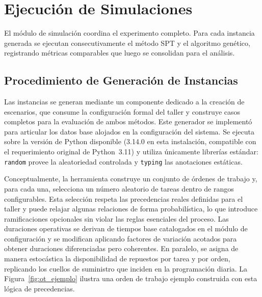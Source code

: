 \section{Ejecución de Simulaciones}

El módulo de simulación coordina el experimento completo. Para cada instancia generada se ejecutan consecutivamente el método SPT y el algoritmo genético, registrando métricas comparables que luego se consolidan para el análisis.

\subsection{Procedimiento de Generación de Instancias}
\label{subsec:procedimiento-instancias}

Las instancias se generan mediante un componente dedicado a la creación de escenarios, que consume la configuración formal del taller y construye casos completos para la evaluación de ambos métodos. Este generador se implementó para articular los datos base alojados en la configuración del sistema. Se ejecuta sobre la versión de Python disponible (3.14.0 en esta instalación, compatible con el requerimiento original de Python~3.11) y utiliza únicamente librerías estándar: \texttt{random} provee la aleatoriedad controlada y \texttt{typing} las anotaciones estáticas.

Conceptualmente, la herramienta construye un conjunto de órdenes de trabajo y, para cada una, selecciona un número aleatorio de tareas dentro de rangos configurables. Esta selección respeta las precedencias reales definidas para el taller y puede relajar algunas relaciones de forma probabilística, lo que introduce ramificaciones opcionales sin violar las reglas esenciales del proceso. Las duraciones operativas se derivan de tiempos base catalogados en el módulo de configuración y se modifican aplicando factores de variación acotados para obtener duraciones diferenciadas pero coherentes. En paralelo, se asigna de manera estocástica la disponibilidad de repuestos por tarea y por orden, replicando los cuellos de suministro que inciden en la programación diaria. La Figura~\ref{fig:ot_ejemplo} ilustra una orden de trabajo ejemplo construida con esta lógica de precedencias.

